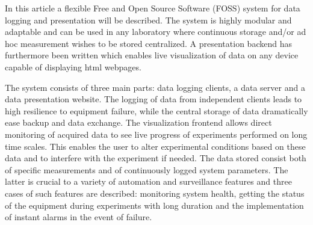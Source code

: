 In this article a flexible Free and Open Source Software (FOSS) system for data
logging and presentation will be described. The system is highly modular and
adaptable and can be used in any laboratory where continuous storage and/or ad
hoc measurement wishes to be stored centralized. A presentation backend has
furthermore been written which enables live visualization of data on any device
capable of displaying html webpages.

The system consists of three main parts: data logging clients, a data server
and a data presentation website. The logging of data from independent clients
leads to high resilience to equipment failure, while the central storage of
data dramatically ease backup and data exchange. The visualization frontend
allows direct monitoring of acquired data to see live progress of experiments
performed on long time scales. This enables the user to alter experimental
conditions based on these data and to interfere with the experiment if needed.
The data stored consist both of specific measurements and of continuously
logged system parameters. The latter is crucial to a variety of automation and
surveillance features and three cases of such features are described:
monitoring system health, getting the status of the equipment during
experiments with long duration and the implementation of instant alarms in the
event of failure.
